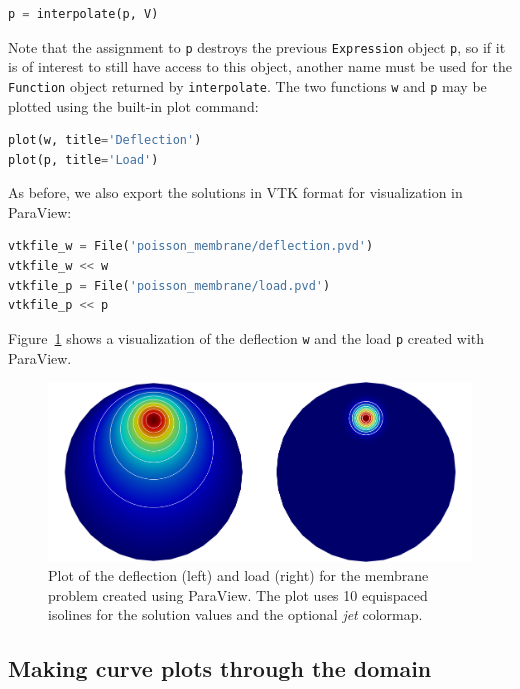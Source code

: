 \documentclass[graybox,envcountchap,sectrefs,final]{svmonodo}
\begin{document}
\begin{lstlisting}[language=Python,style=graycolor]
p = interpolate(p, V)
\end{lstlisting}
Note that the assignment to \texttt{p} destroys the previous \texttt{Expression}
object \texttt{p}, so if it is of interest to still have access to this
object, another name must be used for the \texttt{Function} object returned
by \texttt{interpolate}. The two functions \texttt{w} and \texttt{p} may be plotted
using the built-in plot command:

\begin{lstlisting}[language=Python,style=graycolor]
plot(w, title='Deflection')
plot(p, title='Load')
\end{lstlisting}
As before, we also export the solutions in VTK format for
visualization in ParaView:

\begin{lstlisting}[language=Python,style=graycolor]
vtkfile_w = File('poisson_membrane/deflection.pvd')
vtkfile_w << w
vtkfile_p = File('poisson_membrane/load.pvd')
vtkfile_p << p
\end{lstlisting}
Figure~\ref{fig:poisson_membrane_deflection_load} shows a visualization
of the deflection \texttt{w} and the load \texttt{p} created with ParaView.


\begin{figure}[!ht]  %
  \centerline{\includegraphics[width=0.95\linewidth]{fig/poisson_membrane_deflection_load.png}}
  \caption{
  Plot of the deflection (left) and load (right) for the membrane problem created using ParaView. The plot uses 10 equispaced isolines for the solution values and the optional \emph{jet} colormap. \label{fig:poisson_membrane_deflection_load}
  }
\end{figure}

\subsection{Making curve plots through the domain}
\end{document}
